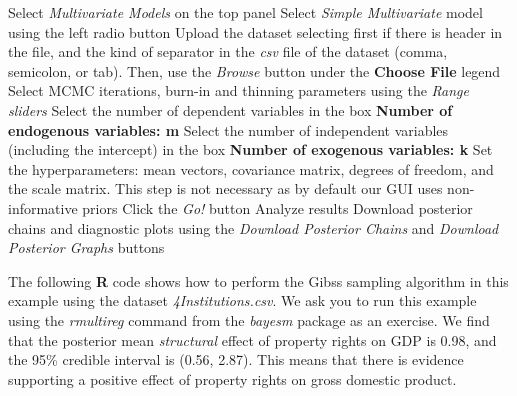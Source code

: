 \begin{algorithm}[h!]
	\caption{Multivariate linear model}\label{alg:MultReg}
	\begin{algorithmic}[1]  		 			
		\State Select \textit{Multivariate Models} on the top panel
		\State Select \textit{Simple Multivariate} model using the left radio button
		\State Upload the dataset selecting first if there is header in the file, and the kind of separator in the \textit{csv} file of the dataset (comma, semicolon, or tab). Then, use the \textit{Browse} button under the \textbf{Choose File} legend
		\State Select MCMC iterations, burn-in and thinning parameters using the \textit{Range sliders}
		\State Select the number of dependent variables in the box \textbf{Number of endogenous variables: m}
		\State Select the number of independent variables (including the intercept) in the box \textbf{Number of exogenous variables: k}
		\State Set the hyperparameters: mean vectors, covariance matrix, degrees of freedom, and the scale matrix. This step is not necessary as by default our GUI uses non-informative priors
		\State Click the \textit{Go!} button
		\State Analyze results
		\State Download posterior chains and diagnostic plots using the \textit{Download Posterior Chains} and \textit{Download Posterior Graphs} buttons
	\end{algorithmic} 
\end{algorithm}

The following \textbf{R} code shows how to perform the Gibss sampling algorithm in this example using the dataset \textit{4Institutions.csv}. We ask you to run this example using the \textit{rmultireg} command from the \textit{bayesm} package as an exercise. We find that the posterior mean \textit{structural} effect of property rights on GDP is 0.98, and the 95\% credible interval is (0.56, 2.87). This means that there is evidence supporting a positive effect of property rights on gross domestic product. 

